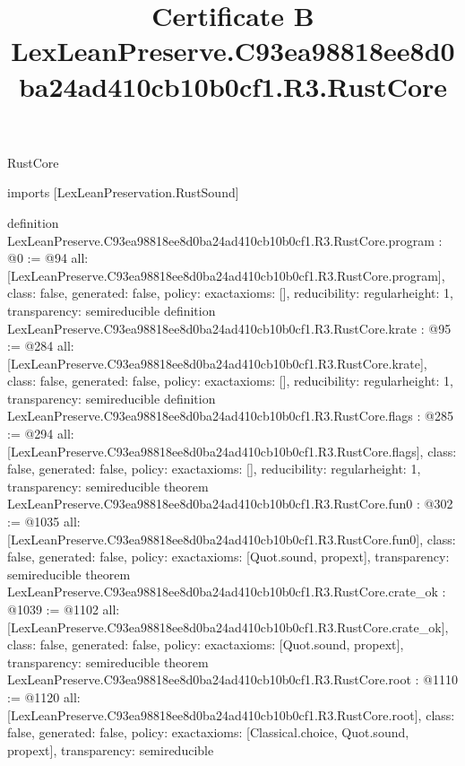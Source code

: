 \begin{lexlean}{RustCore}
\title{Certificate B LexLeanPreserve.C93ea98818ee8d0ba24ad410cb10b0cf1.R3.RustCore}
\begin{coremodule}
imports [LexLeanPreservation.RustSound]

definition LexLeanPreserve.C93ea98818ee8d0ba24ad410cb10b0cf1.R3.RustCore.program : @0 := @94 {
  all: [LexLeanPreserve.C93ea98818ee8d0ba24ad410cb10b0cf1.R3.RustCore.program],
  class: false,
  generated: false,
  policy: exact{axioms: []},
  reducibility: regular{height: 1},
  transparency: semireducible
}
definition LexLeanPreserve.C93ea98818ee8d0ba24ad410cb10b0cf1.R3.RustCore.krate : @95 := @284 {
  all: [LexLeanPreserve.C93ea98818ee8d0ba24ad410cb10b0cf1.R3.RustCore.krate],
  class: false,
  generated: false,
  policy: exact{axioms: []},
  reducibility: regular{height: 1},
  transparency: semireducible
}
definition LexLeanPreserve.C93ea98818ee8d0ba24ad410cb10b0cf1.R3.RustCore.flags : @285 := @294 {
  all: [LexLeanPreserve.C93ea98818ee8d0ba24ad410cb10b0cf1.R3.RustCore.flags],
  class: false,
  generated: false,
  policy: exact{axioms: []},
  reducibility: regular{height: 1},
  transparency: semireducible
}
theorem LexLeanPreserve.C93ea98818ee8d0ba24ad410cb10b0cf1.R3.RustCore.fun0 : @302 := @1035 {
  all: [LexLeanPreserve.C93ea98818ee8d0ba24ad410cb10b0cf1.R3.RustCore.fun0],
  class: false,
  generated: false,
  policy: exact{axioms: [Quot.sound, propext]},
  transparency: semireducible
}
theorem LexLeanPreserve.C93ea98818ee8d0ba24ad410cb10b0cf1.R3.RustCore.crate_ok : @1039 := @1102 {
  all: [LexLeanPreserve.C93ea98818ee8d0ba24ad410cb10b0cf1.R3.RustCore.crate_ok],
  class: false,
  generated: false,
  policy: exact{axioms: [Quot.sound, propext]},
  transparency: semireducible
}
theorem LexLeanPreserve.C93ea98818ee8d0ba24ad410cb10b0cf1.R3.RustCore.root : @1110 := @1120 {
  all: [LexLeanPreserve.C93ea98818ee8d0ba24ad410cb10b0cf1.R3.RustCore.root],
  class: false,
  generated: false,
  policy: exact{axioms: [Classical.choice, Quot.sound, propext]},
  transparency: semireducible
}


\end{coremodule}
\end{lexlean}
